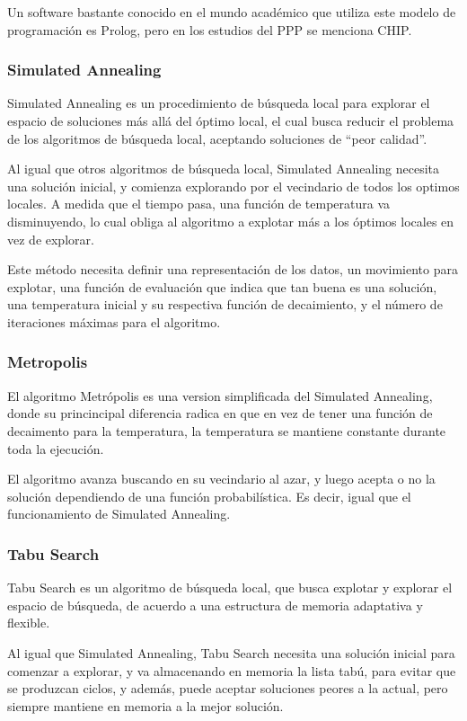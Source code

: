 \documentclass[letter, 10pt]{article}
\begin{document}
Un software bastante conocido en el mundo académico que utiliza este modelo de programación es Prolog, pero en los estudios del PPP se menciona CHIP.

\subsubsection{Simulated Annealing}
Simulated Annealing es un procedimiento de búsqueda local para explorar el espacio de soluciones más allá del óptimo local, el cual busca reducir el problema de los algoritmos de búsqueda local, aceptando soluciones de ``peor calidad''.

Al igual que otros algoritmos de búsqueda local, Simulated Annealing necesita una solución inicial, y comienza explorando por el vecindario de todos los optimos locales. A medida que el tiempo pasa, una función de temperatura va disminuyendo, lo cual obliga al algoritmo a explotar más a los óptimos locales en vez de explorar.

Este método necesita definir una representación de los datos, un movimiento para explotar, una función de evaluación que indica que tan buena es una solución, una temperatura inicial y su respectiva función de decaimiento, y el número de iteraciones máximas para el algoritmo.

\subsubsection{Metropolis}
El algoritmo Metrópolis es una version simplificada del Simulated Annealing, donde su princincipal diferencia radica en que en vez de tener una función de decaimento para la temperatura, la temperatura se mantiene constante durante toda la ejecución.

El algoritmo avanza buscando en su vecindario al azar, y luego acepta o no la solución dependiendo de una función probabilística. Es decir, igual que el funcionamiento de Simulated Annealing.

\subsubsection{Tabu Search}
Tabu Search es un algoritmo de búsqueda local, que busca explotar y explorar el espacio de búsqueda, de acuerdo a una estructura de memoria adaptativa y flexible.

Al igual que Simulated Annealing, Tabu Search necesita una solución inicial para comenzar a explorar, y va almacenando en memoria la lista tabú, para evitar que se produzcan ciclos, y además, puede aceptar soluciones peores a la actual, pero siempre mantiene en memoria a la mejor solución.
\end{document}
